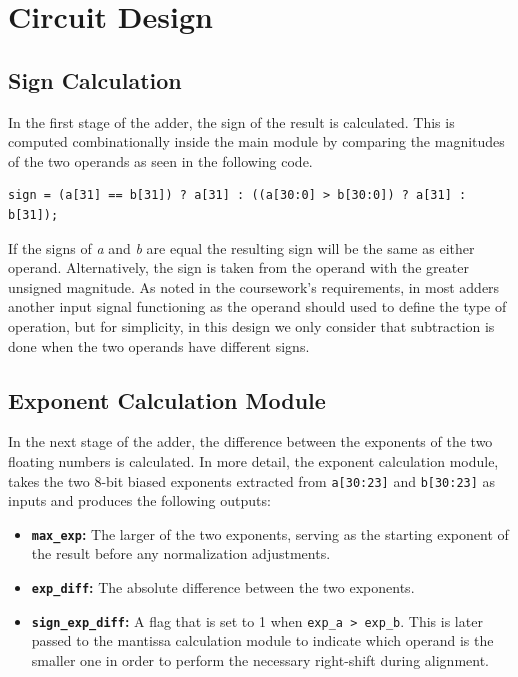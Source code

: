 \documentclass[12pt]{report}
\begin{document}
\chapter{Circuit Design}

\section{Sign Calculation}
In the first stage of the adder, the sign of the result is calculated. This is computed combinationally inside the main module by comparing the magnitudes of the two operands as seen in the following code.

\hspace{10pt}

\begin{lstlisting}[style=svstyle]
sign = (a[31] == b[31]) ? a[31] : ((a[30:0] > b[30:0]) ? a[31] : b[31]);
\end{lstlisting}

\hspace{10pt}

\noindent If the signs of \textit{a} and \textit{b} are equal the resulting sign will be the same as either operand. Alternatively, the sign is taken from the operand with the greater unsigned magnitude. As noted in the coursework's requirements, in most adders another input signal functioning as the operand should used to define the type of operation, but for simplicity, in this design we only consider that subtraction is done when the two operands have different 
signs.

\section{Exponent Calculation Module}
In the next stage of the adder, the difference between the exponents of the two floating numbers is calculated. In more detail, the exponent calculation module, takes the two 8-bit biased exponents extracted from \lstinline{a[30:23]} and \lstinline{b[30:23]} as inputs and produces the following outputs:

\begin{itemize}
    \item \textbf{\lstinline{max_exp}:} The larger of the two exponents, serving as the starting exponent of the result before any normalization adjustments.
    \item \textbf{\lstinline{exp_diff}:} The absolute difference between the two exponents.
    \item \textbf{\lstinline{sign_exp_diff}:} A flag that is set to 1 when \lstinline{exp_a > exp_b}. This is later passed to the mantissa calculation module to indicate which operand is the smaller one in order to perform the necessary right-shift during alignment.
\end{itemize}
\end{document}
